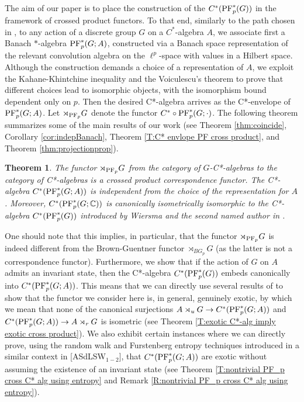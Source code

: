 \documentclass[12pt]{amsart}
\newtheorem{thmx}{Theorem}
\theoremstyle{definition}
\theoremstyle{remark}
\numberwithin{equation}{section}
\newcommand{\C}{\mathbb{C}}
\begin{document}
The aim of our paper is to place the construction of the $C^*(\textup{PF}_p^*(G))$ in the framework of crossed product functors. To that end, similarly to the path chosen in \cite{SW2}, to any action of a discrete group $G$ on a $C^*$-algebra $A$, we associate first a Banach $*$-algebra $\textup{PF}^*_p(G;A)$, constructed via a Banach space representation of the relevant convolution algebra on the $\ell^p$-space with values in a Hilbert space. Although the construction demands a choice of a representation of $A$, we exploit the Kahane-Khintchine inequality and the Voiculescu's theorem to prove that different choices lead to isomorphic objects, with the isomorphism bound dependent only on $p$.  Then the desired C*-algebra arrives as the C*-envelope of $\textup{PF}^*_p(G;A)$. Let $\rtimes_{\textup{PF}_p} G$ denote the functor $C^* \circ \textup{PF}^*_p(G;\cdot)$. The following theorem summarizes some of the main results of our work (see Theorem \ref{thm:coincide}, Corollary \ref{cor:indepBanach}, Theorem \ref{T:C* envlope PF cross product}, and Theorem \ref{thm:projectionprop}).

\begin{thmx} \label{thmA}
	The functor $\rtimes_{\textup{PF}_p} G$
	from the category of $G$-C*-algebras to the category of C*-algebras is a crossed product correspondence functor. The C*-algebra $C^*(\textup{PF}^*_p(G;A))$ is independent from the choice of the representation for $A$. Moreover, $C^*(\textup{PF}^*_p(G;\C))$ is canonically isometrically isomorphic to the C*-algebra  $C^*(\textup{PF}^*_p(G))$ introduced by Wiersma and the second named author in \cite{SW2}.
\end{thmx}

One should note that this implies, in particular, that the functor $\rtimes_{\textup{PF}_p} G$ is indeed different from the Brown-Guentner functor $\rtimes_{BG_p} G$ (as the latter is not a correspondence functor). Furthermore, we show that if the action of $G$ on $A$ admits an invariant state, then the C*-algebra $C^*(\textup{PF}_p^*(G))$ embeds canonically into $C^*(\textup{PF}^*_p(G;A))$. This means that we can directly use several results of \cite{SW2} to show that the functor we consider here is, in general, genuinely exotic, by which we mean that none of the canonical surjections $A\rtimes_u G \to C^*(\textup{PF}^*_p(G;A))$ and $C^*(\textup{PF}^*_p(G;A)) \to A\rtimes_r G$ is isometric (see Theorem \ref{T:exotic C*-alg imply exotic cross product}). We also exhibit certain instances where we can directly prove, using the random walk and Furstenberg entropy techniques introduced in a similar context in [ASdLSW$_{1-2}$], that  $C^*(\textup{PF}^*_p(G;A))$ are exotic without assuming the existence of an invariant state (see Theorem \ref{T:nontrivial PF_p cross C* alg using entropy} and Remark \ref{R:nontrivial PF_p cross C* alg using entropy}).
\end{document}
